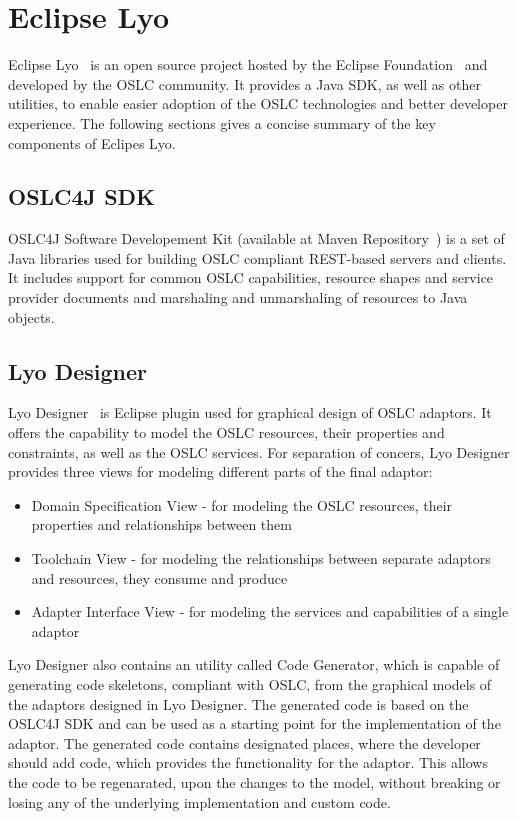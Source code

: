 \section{Eclipse Lyo}
Eclipse Lyo \cite{eclipse_lyo} is an open source project hosted by the Eclipse Foundation \cite{eclipse} and developed by the OSLC community. It provides a Java SDK, as well as other utilities, to enable easier adoption of the OSLC technologies and better developer experience. The following sections gives a concise summary of the key components of Eclipes Lyo.

\subsection*{OSLC4J SDK}
OSLC4J Software Developement Kit (available at Maven Repository \cite{maven_oslc4j}) is a set of Java libraries used for building OSLC compliant REST-based servers and clients. It includes support for common OSLC capabilities, resource shapes and service provider documents and marshaling and unmarshaling of resources to Java objects. 

\subsection*{Lyo Designer}
Lyo Designer \cite{lyo_designer} is Eclipse plugin used for graphical design of OSLC adaptors. It offers the capability to model the OSLC resources, their properties and constraints, as well as the OSLC services. For separation of concers, Lyo Designer provides three views for modeling different parts of the final adaptor:

\begin{itemize}
  \item Domain Specification View - for modeling the OSLC resources, their properties and relationships between them
  \item Toolchain View - for modeling the relationships between separate adaptors and resources, they consume and produce
  \item Adapter Interface View - for modeling the services and capabilities of a single adaptor
\end{itemize}

Lyo Designer also contains an utility called Code Generator, which is capable of generating code skeletons, compliant with OSLC, from the graphical models of the adaptors designed in Lyo Designer. The generated code is based on the OSLC4J SDK and can be used as a starting point for the implementation of the adaptor. The generated code contains designated places, where the developer should add code, which provides the functionality for the adaptor. This allows the code to be regenarated, upon the changes to the model, without breaking or losing any of the underlying implementation and custom code.

